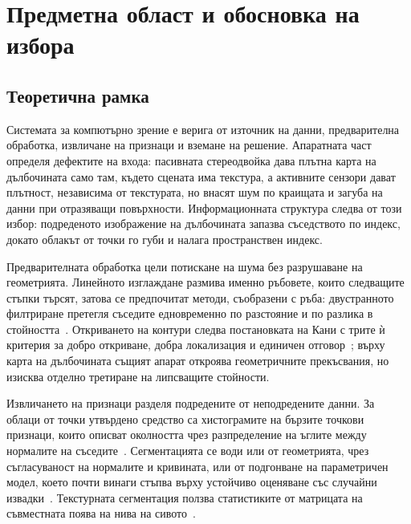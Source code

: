\section{Предметна област и обосновка на избора}
\label{sec:literature}

\subsection{Теоретична рамка}

Системата за компютърно зрение е верига от източник на данни, предварителна обработка,
извличане на признаци и вземане на решение. Апаратната част определя дефектите на входа:
пасивната стереодвойка дава плътна карта на дълбочината само там, където сцената има
текстура, а активните сензори дават плътност, независима от текстурата, но внасят шум по
краищата и загуба на данни при отразяващи повърхности. Информационната структура следва от
този избор: подреденото изображение на дълбочината запазва съседството по индекс, докато
облакът от точки го губи и налага пространствен индекс.

Предварителната обработка цели потискане на шума без разрушаване на геометрията. Линейното
изглаждане размива именно ръбовете, които следващите стъпки търсят, затова се предпочитат
методи, съобразени с ръба: двустранното филтриране претегля съседите едновременно по
разстояние и по разлика в стойността~\cite{tomasi1998bilateral}. Откриването на контури
следва постановката на Кани с трите ѝ критерия за добро откриване, добра локализация и
единичен отговор~\cite{canny1986edge}; върху карта на дълбочината същият апарат откроява
геометричните прекъсвания, но изисква отделно третиране на липсващите стойности.

Извличането на признаци разделя подредените от неподредените данни. За облаци от точки
утвърдено средство са хистограмите на бързите точкови признаци, които описват околността чрез
разпределение на ъглите между нормалите на съседите~\cite{rusu2009fpfh}. Сегментацията се води
или от геометрията, чрез съгласуваност на нормалите и кривината, или от подгонване на
параметричен модел, което почти винаги стъпва върху устойчиво оценяване със случайни
извадки~\cite{fischler1981ransac}. Текстурната сегментация ползва статистиките от матрицата на
съвместната поява на нива на сивото~\cite{haralick1973texture}.

